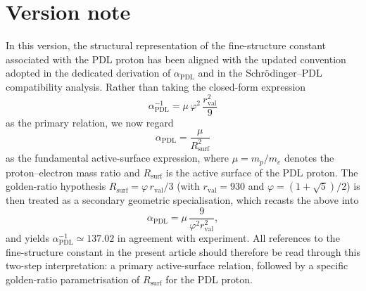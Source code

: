 \documentclass[11pt,a4paper]{article}
\begin{document}
\begin{abstract}
The present paper constitutes an initial step toward narrowing this gap. We formulate explicit axiomatic and phenomenological constraints on admissible proton architectures within PDL, encompassing divisibility conditions on valence multiplicities, specifications for stationary versus dynamical fractions, active-surface definitions linked to the fine-structure constant, and bounds obtained from coherence optimisation.\cite{LaubscherIntroPDL2026,LaubscherPDLFull2026,LaubscherLDP2026,LaubscherIMRadPDL2026} On this basis, we reformulate the selection of the proton integers as an integer-combinatorics problem on signed graphs and introduce a rigorous notion of admissible configuration. We then demonstrate that the currently employed quintuplet $(24,28,930,10\,087,11\,017)$ satisfies all constraints simultaneously and reproduces the established PDL-based numerical correspondences, thereby substantiating its distinguished role within the framework.\cite{LaubscherPDLFull2026,LaubscherLDP2026,LaubscherDerivationAlpha2026} Finally, we propose a conjecture of combinatorial uniqueness for this quintuplet under the stated constraints and outline both analytical and computational methodologies for its verification. The outcome is not a proof, but rather a mathematically structured problem formulation that can be pursued in subsequent research in graph theory and mathematical physics.
\end{abstract}

\section*{Version note}
In this version, the structural representation of the fine-structure constant associated with the PDL proton has been aligned with the updated convention adopted in the dedicated derivation of $\alpha_{\mathrm{PDL}}$ and in the Schrödinger–PDL compatibility analysis.
Rather than taking the closed-form expression
\[
\alpha_{\mathrm{PDL}}^{-1} = \mu\,\varphi^{2}\,\frac{r_{\mathrm{val}}^{2}}{9}
\]
as the primary relation, we now regard
\[
\alpha_{\mathrm{PDL}} = \frac{\mu}{R_{\mathrm{surf}}^{2}}
\]
as the fundamental active-surface expression, where $\mu = m_p/m_e$ denotes the proton–electron mass ratio and $R_{\mathrm{surf}}$ is the active surface of the PDL proton.
The golden-ratio hypothesis $R_{\mathrm{surf}} = \varphi\,r_{\mathrm{val}}/3$ (with $r_{\mathrm{val}} = 930$ and $\varphi = (1+\sqrt{5})/2$) is then treated as a secondary geometric specialisation, which recasts the above into
\[
\alpha_{\mathrm{PDL}} = \mu\,\frac{9}{\varphi^{2} r_{\mathrm{val}}^{2}},
\]
and yields $\alpha_{\mathrm{PDL}}^{-1} \simeq 137.02$ in agreement with experiment.
All references to the fine-structure constant in the present article should therefore be read through this two-step interpretation: a primary active-surface relation, followed by a specific golden-ratio parametrisation of $R_{\mathrm{surf}}$ for the PDL proton.
\end{document}
